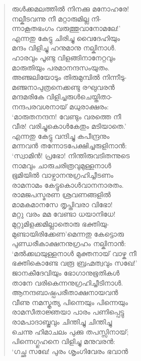 \begin{verse}
രുള്‍ക്കമലത്തില്‍ നിനക്കു മനോഹരേ!\\
നല്കീടവന്നു നീ മറ്റാരുമില്ല നി-\\
ന്നാകൂതഭംഗം വരുത്തുവാനോമലേ!’\\
എന്നതു കേട്ടു ചിരിച്ചു വൈദേഹിയും\\
മന്ദം വിളിച്ചു ഹനുമാനു നല്കിനാള്‍.\\
ഹാരവും പൂണ്ടു വിളങ്ങിനാനേറ്റവും\\
മാരുതിയും പരമാനന്ദസംയുതം.\\
അഞ്ജലിയോടും തിരുമുമ്പില്‍ നിന്നീടു-\\
മഞ്ജനാപുത്രനെക്കണ്ടു രഘുവരന്‍\\
മന്ദമരികേ വിളിച്ചരുള്‍ചെയ്തിതാ-\\
നന്ദപരവശനായ് മധുരാക്ഷരം:\\
‘മാരുതനന്ദന! വേണ്ടും വരത്തെ നീ\\
വീര! വരിച്ചുകൊള്‍കേതും മടിയാതെ.’\\
എന്നതു കേട്ടു വന്ദിച്ചു കപീന്ദ്രനും\\
മന്നവന്‍ തന്നോടപേക്ഷിച്ചരുളിനാന്‍:\\
‘സ്വാമിന്‍! പ്രഭോ! നിന്തിരുവടിതന്നുടെ\\
നാമവും ചാരുചരിത്രവുമുള്ളനാള്‍\\
ഭൂമിയില്‍ വാഴ്വാനനുഗ്രഹിച്ചീടണം\\
രാമനാമം കേട്ടുകൊള്‍വാനനാരതം.\\
രാമജപസ്മരണ ശ്രവണങ്ങളില്‍\\
മാമകമാനസേ തൃപ്തിവരാ വിഭോ!\\
മറ്റു വരം മമ വേണ്ടാ ധയാനിധേ!\\
മുറ്റുമിളക്കമില്ലാതൊരു ഭക്തിയു-\\
മുണ്ടായിരിക്കേണ’മെന്നതു കേട്ടൊരു\\
പുണ്ഡരീകാക്ഷനനുഗ്രഹം നല്കിനാന്‍:\\
‘മല്‍ക്കഥയുള്ളനാള്‍ മുക്തനായ് വാഴ്ക നീ\\
ഭക്തികൊണ്ടേ വരൂ ബ്രഹ്മത്വവും സഖേ!’\\
ജാനകീദേവിയും ഭോഗാനുഭൂതികള്‍\\
താനേ വരികെന്നനുഗ്രഹിച്ചീടിനാള്‍.\\
ആനന്ദബാഷ്പപരീതാക്ഷനായവന്‍\\
വീണു നമസ്കൃത്യ പിന്നെയും പിന്നെയും\\
രാമസീതാജ്ഞയാ പാരം പണിപ്പെട്ടു\\
രാമപാദാബ്ജവും ചിന്തിച്ചു ചിന്തിച്ചു\\
ചെന്നു ഹിമാചലം പുക്കു തപസ്സിനായ്;\\
പിന്നെഗ്ഗുഹനെ വിളിച്ചു മനുവരന്‍:\\
‘ഗച്ഛ സഖേ! പുരം ശൃംഗിവേരം ഭവാന്‍\\

\end{verse}
